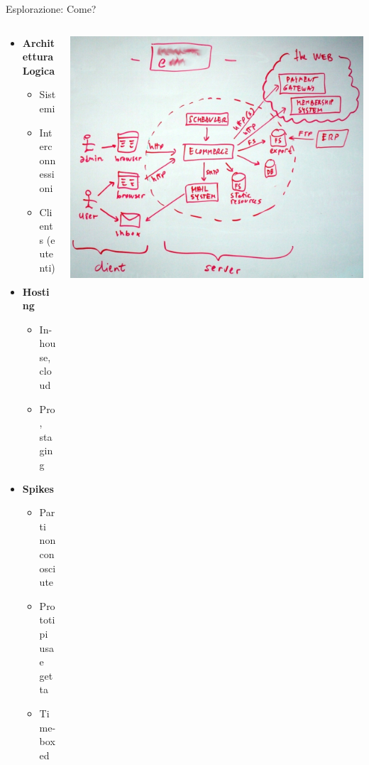 	\begin{frame}{Esplorazione: Come?}
		
		\begin{columns}[T]
		    \begin{column}{.5\textwidth}

		\begin{itemize}
			\item \textbf{Architettura Logica}
			\begin{itemize}
				\item Sistemi
				\item Interconnessioni
				\item Clients (e utenti)
			\end{itemize}
			\item \textbf{Hosting}
			\begin{itemize}
				\item In-house, cloud
				\item Pro, staging
			\end{itemize}
			\item \textbf{Spikes}
			\begin{itemize}
				\item Parti non conosciute
				\item Prototipi usa e getta
				\item Time-boxed
			\end{itemize}
			
		\end{itemize}
		
	    \end{column}
	    \begin{column}{.5\textwidth}
			\hspace*{-0.6cm} \includegraphics[scale=0.15]{images/architecture-1}
	    \end{column}
	 \end{columns}

	\end{frame}
	
